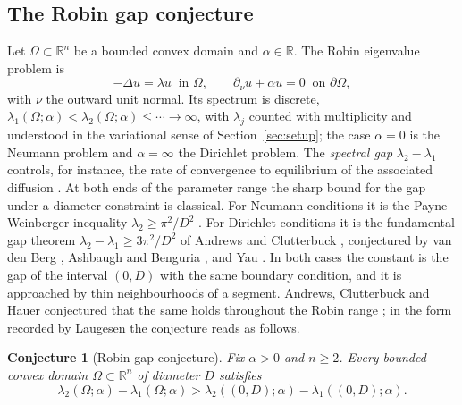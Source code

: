 \documentclass[11pt,a4paper]{article}
\numberwithin{equation}{section}
\theoremstyle{paperplain}
\newtheorem{conjecture}[theorem]{Conjecture}
\theoremstyle{remark}
\newcommand{\R}{\mathbb{R}}
\begin{document}
\subsection{The Robin gap conjecture}
Let $\Omega\subset\R^n$ be a bounded convex domain and $\alpha\in\R$. The
Robin eigenvalue problem is
\[
 -\Delta u=\lambda u\ \text{ in }\Omega,\qquad
 \partial_\nu u+\alpha u=0\ \text{ on }\partial\Omega,
\]
with $\nu$ the outward unit normal. Its spectrum is discrete,
$\lambda_1(\Omega;\alpha)<\lambda_2(\Omega;\alpha)\le\cdots\to\infty$, with
$\lambda_j$ counted with multiplicity and understood in the variational
sense of Section~\ref{sec:setup}; the case $\alpha=0$ is the Neumann
problem and $\alpha=\infty$ the Dirichlet problem. The \emph{spectral gap} $\lambda_2-\lambda_1$ controls, for instance,
the rate of convergence to equilibrium of the associated diffusion
\cite{Smits}. At both ends of the parameter range the sharp bound for the gap under a
diameter constraint is classical. For Neumann conditions it is the
Payne--Weinberger inequality $\lambda_2\ge\pi^2/D^2$ \cite{PW,Bebendorf}.
For Dirichlet conditions it is the fundamental gap theorem
$\lambda_2-\lambda_1\ge3\pi^2/D^2$ of Andrews and Clutterbuck \cite{AC},
conjectured by van den Berg \cite{vandenBerg}, Ashbaugh and Benguria
\cite{AshbaughBenguria}, and Yau \cite{Yau}. In both cases the constant is
the gap of the interval $(0,D)$ with the same boundary condition, and it is
approached by thin neighbourhoods of a segment. Andrews, Clutterbuck and Hauer conjectured that the same holds
throughout the Robin range \cite[Section~10]{ACH}; in the form recorded by
Laugesen \cite[Conjecture~F]{Laugesen} the conjecture reads as follows.

\begin{conjecture}[Robin gap conjecture]\label{conj:gap}
Fix $\alpha>0$ and $n\ge2$. Every bounded convex domain $\Omega\subset\R^n$
of diameter $D$ satisfies
\begin{equation}\label{eq:conjecture}
 \lambda_2(\Omega;\alpha)-\lambda_1(\Omega;\alpha)
 >\lambda_2((0,D);\alpha)-\lambda_1((0,D);\alpha).
\end{equation}
\end{conjecture}
\end{document}
